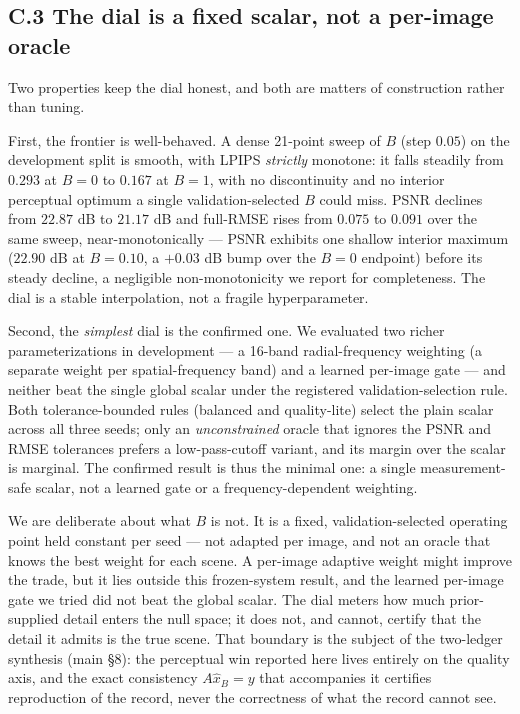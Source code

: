 \documentclass[11pt]{article}
\begin{document}
\subsection*{C.3 The dial is a fixed scalar, not a per-image oracle}

Two properties keep the dial honest, and both are matters of construction rather than tuning.

First, the frontier is well-behaved. A dense 21-point sweep of $B$ (step $0.05$) on the development split is smooth, with LPIPS \textit{strictly} monotone: it falls steadily from $0.293$ at $B = 0$ to $0.167$ at $B = 1$, with no discontinuity and no interior perceptual optimum a single validation-selected $B$ could miss. PSNR declines from $22.87$ dB to $21.17$ dB and full-RMSE rises from $0.075$ to $0.091$ over the same sweep, near-monotonically --- PSNR exhibits one shallow interior maximum ($22.90$ dB at $B = 0.10$, a $+0.03$ dB bump over the $B=0$ endpoint) before its steady decline, a negligible non-monotonicity we report for completeness. The dial is a stable interpolation, not a fragile hyperparameter.

Second, the \textit{simplest} dial is the confirmed one. We evaluated two richer parameterizations in development --- a 16-band radial-frequency weighting (a separate weight per spatial-frequency band) and a learned per-image gate --- and neither beat the single global scalar under the registered validation-selection rule. Both tolerance-bounded rules (balanced and quality-lite) select the plain scalar across all three seeds; only an \textit{unconstrained} oracle that ignores the PSNR and RMSE tolerances prefers a low-pass-cutoff variant, and its margin over the scalar is marginal. The confirmed result is thus the minimal one: a single measurement-safe scalar, not a learned gate or a frequency-dependent weighting.

We are deliberate about what $B$ is not. It is a fixed, validation-selected operating point held constant per seed --- not adapted per image, and not an oracle that knows the best weight for each scene. A per-image adaptive weight might improve the trade, but it lies outside this frozen-system result, and the learned per-image gate we tried did not beat the global scalar. The dial meters how much prior-supplied detail enters the null space; it does not, and cannot, certify that the detail it admits is the true scene. That boundary is the subject of the two-ledger synthesis (main §8): the perceptual win reported here lives entirely on the quality axis, and the exact consistency $A\hat{x}_B = y$ that accompanies it certifies reproduction of the record, never the correctness of what the record cannot see.
\end{document}
